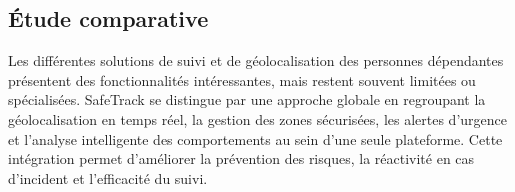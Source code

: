 \subsection{Étude comparative}
Les différentes solutions de suivi et de géolocalisation des personnes dépendantes présentent des fonctionnalités intéressantes, mais restent souvent limitées ou spécialisées. SafeTrack se distingue par une approche globale en regroupant la géolocalisation en temps réel, la gestion des zones sécurisées, les alertes d'urgence et l'analyse intelligente des comportements au sein d'une seule plateforme. Cette intégration permet d'améliorer la prévention des risques, la réactivité en cas d'incident et l'efficacité du suivi.


